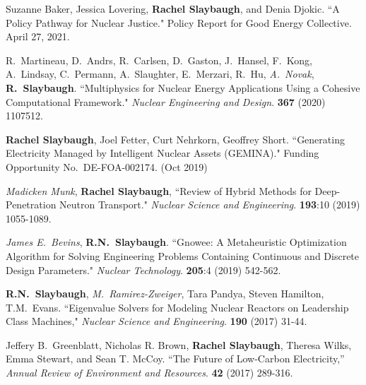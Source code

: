 \begin{bibsection}
\item Suzanne Baker, Jessica Lovering, \textbf{Rachel Slaybaugh}, and Denia Djokic. ``A Policy Pathway for Nuclear Justice." Policy Report for Good Energy Collective. April 27, 2021. %

\item R.\ Martineau, D.\ Andrs, R.\ Carlsen, D.\ Gaston, J.\ Hansel, F.\ Kong, A.\ Lindsay, C.\ Permann, A.\ Slaughter, E.\ Merzari, R.\ Hu, \textit{A.\ Novak}, \textbf{R.\ Slaybaugh}. ``Multiphysics for
Nuclear Energy Applications Using a Cohesive Computational Framework."
\textit{Nuclear Engineering and Design}. \textbf{367} (2020) 1107512.%

\item \textbf{Rachel Slaybaugh}, Joel Fetter, Curt Nehrkorn, Geoffrey Short. ``Generating Electricity Managed by Intelligent Nuclear
Assets (GEMINA)." Funding Opportunity No.\ DE-FOA-002174. (Oct 2019)%

\item \textit{Madicken Munk}, \textbf{Rachel Slaybaugh}, ``Review of Hybrid Methods for Deep-Penetration Neutron Transport."  \textit{Nuclear Science and Engineering}. \textbf{193}:10 (2019) 1055-1089.%

\item \textit{James E.\ Bevins}, \textbf{R.N.\ Slaybaugh}. ``Gnowee: A Metaheuristic Optimization Algorithm for Solving Engineering Problems Containing Continuous and Discrete Design Parameters." \textit{Nuclear Technology}. \textbf{205}:4 (2019) 542-562.%

\item \textbf{R.N.\ Slaybaugh}, \textit{M.\ Ramirez-Zweiger}, Tara Pandya, Steven Hamilton, T.M.\ Evans. ``Eigenvalue Solvers for Modeling Nuclear Reactors on Leadership Class Machines," \textit{Nuclear Science and Engineering}. \textbf{190} (2017) 31-44.%

\item Jeffery B.\ Greenblatt, Nicholas R. Brown, \textbf{Rachel Slaybaugh}, Theresa Wilks, Emma Stewart, and Sean T. McCoy. ``The Future of Low-Carbon Electricity,'' \textit{Annual Review of Environment and Resources}. \textbf{42} (2017) 289-316. %
\end{bibsection}

